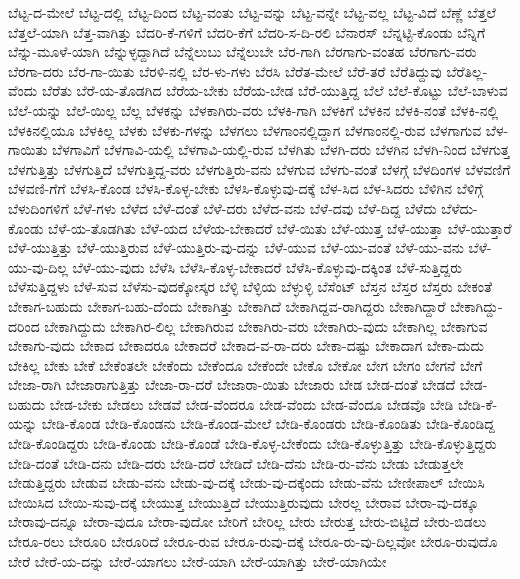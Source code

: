 {ಬೆಟ್ಟ-ದ-ಮೇಲೆ
ಬೆಟ್ಟ-ದಲ್ಲಿ
ಬೆಟ್ಟ-ದಿಂದ
ಬೆಟ್ಟ-ವಂತು
ಬೆಟ್ಟ-ವನ್ನು
ಬೆಟ್ಟ-ವನ್ನೇ
ಬೆಟ್ಟ-ವಲ್ಲ
ಬೆಟ್ಟ-ವಿದೆ
ಬೆಣ್ಣೆ
ಬೆತ್ತಲೆ
ಬೆತ್ತಲೆ-ಯಾಗಿ
ಬೆತ್ತ-ವಾಗಿತ್ತು
ಬೆದರಿ-ಕೆ-ಗಳಿಗೆ
ಬೆದರಿ-ಕೆಗೆ
ಬೆದರಿ-ಸ-ದಿ-ರಲಿ
ಬೆನಾರಸ್
ಬೆನ್ನಟ್ಟಿ-ಕೊಂಡು
ಬೆನ್ನಿಗೆ
ಬೆನ್ನು-ಮೂಳೆ-ಯಾಗಿ
ಬೆನ್ನುಳ್ಳದ್ದಾಗಿದೆ
ಬೆನ್ನೆಲುಬು
ಬೆನ್ನೆಲುಬೇ
ಬೆರ-ಗಾಗಿ
ಬೆರಗಾಗು-ವಂತಹ
ಬೆರಗಾಗು-ವರು
ಬೆರಗಾ-ದರು
ಬೆರ-ಗಾ-ಯಿತು
ಬೆರಳಿ-ನಲ್ಲಿ
ಬೆರ-ಳು-ಗಳು
ಬೆರಸಿ
ಬೆರೆತ-ಮೇಲೆ
ಬೆರೆ-ತರೆ
ಬೆರೆತಿದ್ದುವು
ಬೆರೆತಿಲ್ಲ-ವೆಂದು
ಬೆರೆತು
ಬೆರೆ-ಯ-ತೊಡಗಿದ
ಬೆರೆಯ-ಬೇಕು
ಬೆರೆಯ-ಬೇಡ
ಬೆರೆ-ಯುತ್ತಿದ್ದ
ಬೆಲೆ
ಬೆಲೆ-ಕೊಟ್ಟು
ಬೆಲೆ-ಬಾಳುವ
ಬೆಲೆ-ಯನ್ನು
ಬೆಲೆ-ಯಿಲ್ಲ
ಬೆಲ್ಲ
ಬೆಳಕನ್ನು
ಬೆಳಕಾಗಿರು-ವರು
ಬೆಳಕಿ-ಗಾಗಿ
ಬೆಳಕಿಗೆ
ಬೆಳಕಿನ
ಬೆಳಕಿ-ನಂತೆ
ಬೆಳಕಿ-ನಲ್ಲಿ
ಬೆಳಕಿನಲ್ಲಿಯೂ
ಬೆಳಕಿಲ್ಲ
ಬೆಳಕು
ಬೆಳಕು-ಗಳನ್ನು
ಬೆಳಗಲು
ಬೆಳಗಾಂನಲ್ಲಿದ್ದಾಗ
ಬೆಳಗಾಂನಲ್ಲಿ-ರುವ
ಬೆಳಗಾಗುವ
ಬೆಳ-ಗಾಯಿತು
ಬೆಳಗಾವಿಗೆ
ಬೆಳಗಾವಿ-ಯಲ್ಲಿ
ಬೆಳಗಾವಿ-ಯಲ್ಲಿ-ರುವ
ಬೆಳಗಿತು
ಬೆಳಗಿ-ದರು
ಬೆಳಗಿನ
ಬೆಳಗಿ-ನಿಂದ
ಬೆಳಗುತ್ತ
ಬೆಳಗುತ್ತಿತ್ತು
ಬೆಳಗುತ್ತಿದೆ
ಬೆಳಗುತ್ತಿದ್ದ-ವರು
ಬೆಳಗುತ್ತಿರು-ವನು
ಬೆಳಗುವ
ಬೆಳಗು-ವಂತೆ
ಬೆಳಗ್ಗೆ
ಬೆಳದಿಂಗಳ
ಬೆಳವಣಿಗೆ
ಬೆಳವಣಿ-ಗೆಗೆ
ಬೆಳಸಿ-ಕೊಂಡ
ಬೆಳಸಿ-ಕೊಳ್ಳ-ಬೇಕು
ಬೆಳಸಿ-ಕೊಳ್ಳುವು-ದಕ್ಕೆ
ಬೆಳ-ಸಿದ
ಬೆಳ-ಸಿದರು
ಬೆಳಿಗಿನ
ಬೆಳಿಗ್ಗೆ
ಬೆಳುದಿಂಗಳಿಗೆ
ಬೆಳೆ-ಗಳು
ಬೆಳೆದ
ಬೆಳೆ-ದಂತೆ
ಬೆಳೆ-ದರು
ಬೆಳೆದ-ವನು
ಬೆಳೆ-ದವು
ಬೆಳೆ-ದಿದ್ದ
ಬೆಳೆದು
ಬೆಳೆದು-ಕೊಂಡು
ಬೆಳೆ-ಯ-ತೊಡಗಿತು
ಬೆಳೆ-ಯದ
ಬೆಳೆಯ-ಬೇಕಾದರೆ
ಬೆಳೆ-ಯಿತು
ಬೆಳೆ-ಯುತ್ತ
ಬೆಳೆ-ಯುತ್ತಾ
ಬೆಳೆ-ಯುತ್ತಾರೆ
ಬೆಳೆ-ಯುತ್ತಿತ್ತು
ಬೆಳೆ-ಯುತ್ತಿರುವ
ಬೆಳೆ-ಯುತ್ತಿರು-ವು-ದನ್ನು
ಬೆಳೆ-ಯುವ
ಬೆಳೆ-ಯು-ವಂತೆ
ಬೆಳೆ-ಯು-ವನು
ಬೆಳೆ-ಯು-ವು-ದಿಲ್ಲ
ಬೆಳೆ-ಯು-ವುದು
ಬೆಳೆಸಿ
ಬೆಳೆಸಿ-ಕೊಳ್ಳ-ಬೇಕಾದರೆ
ಬೆಳೆಸಿ-ಕೊಳ್ಳುವು-ದಕ್ಕಿಂತ
ಬೆಳೆ-ಸುತ್ತಿದ್ದರು
ಬೆಳೆಸುತ್ತಿದ್ದಳು
ಬೆಳೆ-ಸುವ
ಬೆಳೆಸು-ವುದಕ್ಕೋಸ್ಕರ
ಬೆಳ್ಳಿ
ಬೆಳ್ಳಿಯ
ಬೆಳ್ಳುಳ್ಳಿ
ಬೆಸೆಂಟ್
ಬೆಸ್ತನ
ಬೆಸ್ತರ
ಬೆಸ್ತರು
ಬೇಕಂತೆ
ಬೇಕಾಗ-ಬಹುದು
ಬೇಕಾಗ-ಬಹು-ದೆಂದು
ಬೇಕಾಗಿತ್ತು
ಬೇಕಾಗಿದೆ
ಬೇಕಾಗಿದ್ದವ-ರಾಗಿದ್ದರು
ಬೇಕಾಗಿದ್ದಾರೆ
ಬೇಕಾಗಿದ್ದು-ದರಿಂದ
ಬೇಕಾಗಿದ್ದುದು
ಬೇಕಾಗಿರ-ಲಿಲ್ಲ
ಬೇಕಾಗಿರುವ
ಬೇಕಾಗಿರು-ವರು
ಬೇಕಾಗಿರು-ವುದು
ಬೇಕಾಗಿಲ್ಲ
ಬೇಕಾಗುವ
ಬೇಕಾಗು-ವುದು
ಬೇಕಾದ
ಬೇಕಾದರೂ
ಬೇಕಾದರೆ
ಬೇಕಾದ-ವ-ರಾ-ದರು
ಬೇಕಾ-ದಷ್ಟು
ಬೇಕಾದಾಗ
ಬೇಕಾ-ದುದು
ಬೇಕಿಲ್ಲ
ಬೇಕು
ಬೇಕೆ
ಬೇಕೆಂತಲೇ
ಬೇಕೆಂದು
ಬೇಕೆಂದೂ
ಬೇಕೆಂದೇ
ಬೇಕೊ
ಬೇಕೋ
ಬೇಗ
ಬೇಗಂ
ಬೇಗನೆ
ಬೇಗೆ
ಬೇಜಾ-ರಾಗಿ
ಬೇಜಾರಾಗುತ್ತಿತ್ತು
ಬೇಜಾ-ರಾ-ದರೆ
ಬೇಜಾರಾ-ಯಿತು
ಬೇಜಾರು
ಬೇಡ
ಬೇಡ-ದಂತೆ
ಬೇಡದೆ
ಬೇಡ-ಬಹುದು
ಬೇಡ-ಬೇಕು
ಬೇಡಲು
ಬೇಡವೆ
ಬೇಡ-ವೆಂದರೂ
ಬೇಡ-ವೆಂದು
ಬೇಡ-ವೆಂದೂ
ಬೇಡವೊ
ಬೇಡಿ
ಬೇಡಿ-ಕೆ-ಯನ್ನು
ಬೇಡಿ-ಕೊಂಡ
ಬೇಡಿ-ಕೊಂಡನು
ಬೇಡಿ-ಕೊಂಡ-ಮೇಲೆ
ಬೇಡಿ-ಕೊಂಡರು
ಬೇಡಿ-ಕೊಂಡಿತು
ಬೇಡಿ-ಕೊಂಡಿದ್ದ
ಬೇಡಿ-ಕೊಂಡಿದ್ದರು
ಬೇಡಿ-ಕೊಂಡು
ಬೇಡಿ-ಕೊಂಡೆ
ಬೇಡಿ-ಕೊಳ್ಳ-ಬೇಕೆಂದು
ಬೇಡಿ-ಕೊಳ್ಳುತ್ತಿತ್ತು
ಬೇಡಿ-ಕೊಳ್ಳುತ್ತಿದ್ದರು
ಬೇಡಿ-ದಂತೆ
ಬೇಡಿ-ದನು
ಬೇಡಿ-ದರು
ಬೇಡಿ-ದರೆ
ಬೇಡಿದೆ
ಬೇಡಿ-ದೆನು
ಬೇಡಿ-ರು-ವೆನು
ಬೇಡು
ಬೇಡುತ್ತಲೇ
ಬೇಡುತ್ತಿದ್ದರು
ಬೇಡುವ
ಬೇಡು-ವನು
ಬೇಡು-ವು-ದಕ್ಕೆ
ಬೇಡು-ವು-ದಕ್ಕೆಂದು
ಬೇಡು-ವೆನು
ಬೇಣೀಪಾಲ್
ಬೇಯಿಸಿ
ಬೇಯಿಸಿದ
ಬೇಯಿ-ಸುವು-ದಕ್ಕೆ
ಬೇಯುತ್ತ
ಬೇಯುತ್ತಿದೆ
ಬೇಯುತ್ತಿರುವುದು
ಬೇರಲ್ಲ
ಬೇರಾವ
ಬೇರಾ-ವು-ದಕ್ಕೂ
ಬೇರಾವು-ದನ್ನೂ
ಬೇರಾ-ವುದೂ
ಬೇರಾ-ವುದೋ
ಬೇರಿಗೆ
ಬೇರಿಲ್ಲ
ಬೇರು
ಬೇರುತ್ತ
ಬೇರು-ಬಿಟ್ಟಿದೆ
ಬೇರು-ಬಿಡಲು
ಬೇರೂ-ರಲು
ಬೇರೂರಿ
ಬೇರೂರಿದೆ
ಬೇರೂ-ರುವ
ಬೇರೂ-ರುವು-ದಕ್ಕೆ
ಬೇರೂ-ರು-ವು-ದಿಲ್ಲವೋ
ಬೇರೂ-ರುವುದೊ
ಬೇರೆ
ಬೇರೆ-ಯ-ದನ್ನು
ಬೇರೆ-ಯಾಗಲು
ಬೇರೆ-ಯಾಗಿ
ಬೇರೆ-ಯಾಗಿತ್ತು
ಬೇರೆ-ಯಾಗಿಯೇ
}
